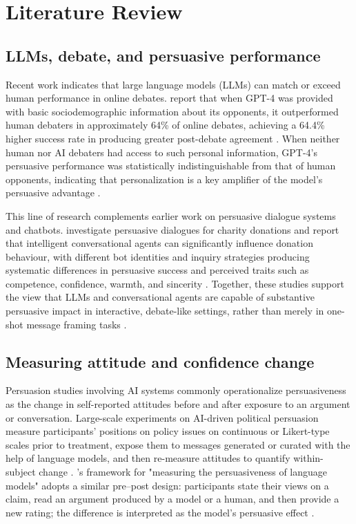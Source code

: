\chapter{Literature Review}


\section{LLMs, debate, and persuasive performance}

Recent work indicates that large language models (LLMs) can match or
exceed human performance in online debates. \textcite{salvi2025_chatgpt_debates} report that
when GPT\mbox{-}4 was provided with basic sociodemographic information about its
opponents, it outperformed human debaters in approximately 64\% of
online debates, achieving a 64.4\% higher success rate in producing
greater post-debate agreement \cite{salvi2025_chatgpt_debates}.
When neither human nor AI debaters had access to such personal information,
GPT\mbox{-}4's persuasive performance was statistically indistinguishable from
that of human opponents, indicating that personalization is a key amplifier
of the model's persuasive advantage \cite{salvi2025_chatgpt_debates}.

This line of research complements earlier work on persuasive
dialogue systems and chatbots. \textcite{shi2020_effects_persuasive_dialogues_bots}
investigate persuasive dialogues for charity donations and report that
intelligent conversational agents can significantly influence donation
behaviour, with different bot identities and inquiry strategies producing
systematic differences in persuasive success and perceived traits such as
competence, confidence, warmth, and sincerity
\cite{shi2020_effects_persuasive_dialogues_bots}. Together, these
studies support the view that LLMs and conversational agents are capable
of substantive persuasive impact in interactive, debate-like settings,
rather than merely in one-shot message framing tasks
\cite{salvi2025_chatgpt_debates,shi2020_effects_persuasive_dialogues_bots}.

\section{Measuring attitude and confidence change}

Persuasion studies involving AI systems commonly operationalize persuasiveness as the change
in self-reported attitudes before and after exposure to an argument or conversation.
Large-scale experiments on AI-driven political persuasion measure participants' positions on
policy issues on continuous or Likert-type scales prior to treatment, expose them to messages
generated or curated with the help of language models, and then re-measure attitudes to quantify
within-subject change \cite{argyle2025_testing_political_persuasion}.
\textcite{durmus2024_measuring_persuasiveness}'s framework for "measuring the persuasiveness of
language models" adopts a similar pre--post design: participants state their views on a claim,
read an argument produced by a model or a human, and then provide a new rating; the difference
is interpreted as the model's persuasive effect \cite{durmus2024_measuring_persuasiveness}.

